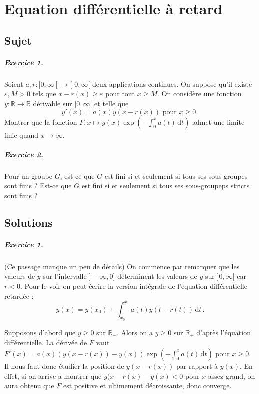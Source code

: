 \chapter{Equation différentielle à retard}

\section{Sujet}

\paragraph{Exercice 1.}

Soient $a, r : [0,\infty[ \to ]0, \infty[$ deux applications continues. On suppose qu'il existe $\varepsilon, M >0$ tels que $x-r(x) \geqslant \varepsilon$ pour tout $x \geqslant M$. On considère une fonction $y : \mathbb{R} \to \mathbb{R}$ dérivable sur $[0,\infty[$ et telle que 
\[y'(x)=a(x)y(x-r(x)) \text{ pour } x \geqslant 0\,.\]
Montrer que la fonction $F : x \mapsto y(x) \exp \left(-\int_0^xa(t)\,\mathrm{d}t\right)$ admet une limite finie quand $x \to \infty$. 

\paragraph{Exercice 2.}

Pour un groupe $G$, est-ce que $G$ est fini si et seulement si tous ses sous-groupes sont finis ? Est-ce que $G$ est fini si et seulement si tous ses sous-groupeps stricts sont finis ? 

\section{Solutions}

\paragraph{Exercice 1.}

(Ce passage manque un peu de détails) On commence par remarquer que les valeurs de $y$ sur l'intervalle $]-\infty,0]$ déterminent les valeurs de $y$ sur $]0,\infty[$ car $r<0$. Pour le voir on peut écrire la version intégrale de l'équation différentielle retardée :
\[y(x)=y(x_0)+\int_{x_0}^xa(t)y(t-r(t))\,\mathrm{d}t\,.\]

Supposons d'abord que $y\geqslant 0$ sur $\mathbb{R}_-$. Alors on a $y \geqslant 0$ sur $\mathbb{R}_+$ d'après l'équation différentielle. La dérivée de $F$ vaut $F'(x)=a(x)(y(x-r(x))-y(x))\exp \left(-\int_0^x a(t)\,\mathrm{d}t\right)$ pour $x \geqslant 0$. Il nous faut donc étudier la position de $y(x-r(x))$ par rapport à $y(x)$. En effet, si on arrive a montrer que $y(x-r(x)-y(x)<0$ pour $x$ assez grand, on aura obtenu que $F$ est positive et ultimement décroissante, donc converge.


